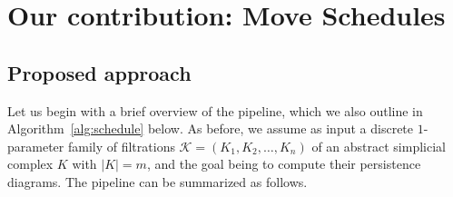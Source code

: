 \documentclass{article} %
\begin{document}

\section{Our contribution: Move Schedules}\label{sec:move_schedules}
%

\subsection{Proposed approach}
Let us begin with a brief overview of the pipeline, which we also outline in Algorithm~\ref{alg:schedule} below.
As before, we assume as input  a discrete $1$-parameter family of filtrations $\mathcal{K} = (K_1, K_2, \dots, K_n)$ of an abstract simplicial complex $K$ with $|K|=m$, 
and the goal being to compute their persistence diagrams.
The pipeline can be summarized as follows.
\end{document}
